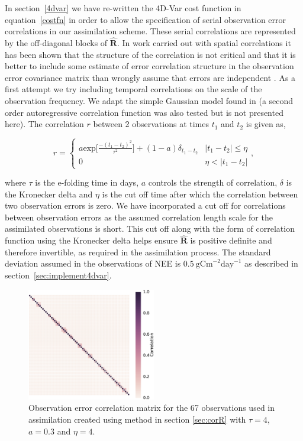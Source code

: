 \documentclass[review]{elsarticle}
\begin{document}
In section~\ref{4dvar} we have re-written the 4D-Var cost function in equation~\eqref{costfn} in order to allow the specification of serial observation error correlations in our assimilation scheme. These serial correlations are represented by the off-diagonal blocks of $\hat{\mathbf{R}}$. In work carried out with spatial correlations it has been shown that the structure of the correlation is not critical and that it is better to include some estimate of error correlation structure in the observation error covariance matrix than wrongly assume that errors are independent \citep{Stewart2013, Healy2005}. As a first attempt we try including temporal correlations on the scale of the observation frequency. We adapt the simple Gaussian model found in \citet{jarvinen1999variational} (a second order autoregressive correlation function was also tested but is not presented here). The correlation $r$ between 2 observations at times $t_1$ and $t_2$ is given as,
\begin{linenomath}
\begin{equation}
r =
\begin{cases} 
      a \text{exp} \bigg[ \frac{-(t_1 - t_2)^2}{\tau^2} \bigg] + (1- a)\delta_{t_1 - t_2} & |t_1 - t_2| \leq \eta \\
      0 & \eta < |t_1 - t_2| 
   \end{cases}
   , \label{eqn:corr_fn}
\end{equation}
\end{linenomath}
where $\tau$ is the e-folding time in days, $a$ controls the strength of correlation, $\delta$ is the Kronecker delta and $\eta$ is the cut off time after which the correlation between two observation errors is zero. We have incorporated a cut off for correlations between observation errors as the assumed correlation length scale for the assimilated observations is short. This cut off along with the form of correlation function using the Kronecker delta helps ensure $\hat{\mathbf{R}}$ is positive definite and therefore invertible, as required in the assimilation process. The standard deviation assumed in the observations of NEE is $0.5~\text{gCm}^{-2}\text{day}^{-1}$ as described in section~\ref{sec:implement4dvar}.

\begin{figure}[ht]
    \centering
    \includegraphics[width=0.5\textwidth]{rcorcor.eps}
    \caption{Observation error correlation matrix for the 67 observations used in assimilation created using method in section \ref{sec:corR} with $\tau = 4$, $a=0.3$ and $\eta=4$.}
    \label{fig:Rcorr}
\end{figure}
\end{document}
